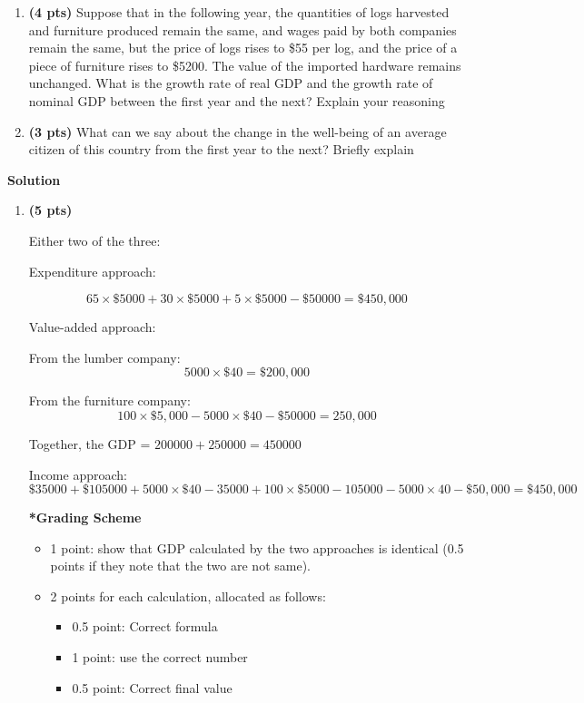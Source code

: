 \documentclass[14pt, oneside]{memoir}
\begin{document}
{{{\begin{enumerate}[label=\textbf{\arabic*.}, itemsep=15pt]
\begin{enumerate}[label=(\alph*)]
	
	\item \textbf{(4 pts)} Suppose that in the following year, the quantities of logs harvested and furniture produced remain the same, and wages paid by both companies remain the same, but the price of logs rises to \$55 per log, and the price of a piece of furniture rises to \$5200. The value of the imported hardware remains unchanged. What is the growth rate of real GDP and the growth rate of nominal GDP between the first year and the next? Explain your reasoning
	
	\item \textbf{(3 pts)} What can we say about the change in the well-being of an average citizen of this country from the first year to the next? Briefly explain
	
\end{enumerate}

\clearpage
\textbf{Solution}
\begin{enumerate}[label=(\alph*)]
	\item \textbf{(5 pts)} 	
	
	Either two of the three:
	
	Expenditure approach:
	
	\[65 \times \$5000 + 30 \times \$5000 + 5 \times \$5000 -\$50000= \$450,000\]
	
	Value-added approach:
	
	From the lumber company:
	\[5000 \times \$40 = \$200,000\]
	
	From the furniture company:
	\[100 \times \$5,000 - 5000 \times \$40  - \$50000= 250,000\]
	
	Together, the GDP = $200000+250000 = 450000$
	
	Income approach:
	\[\$35000 + \$105000 + 5000\times \$40 -35000 + 100 \times \$5000 - 105000 - 5000\times 40 - \$50,000 = \$450,000\]
	
	
	\textbf{*Grading Scheme}
	
	\begin{itemize}
		\item 1 point: show that GDP calculated by the two approaches is identical (0.5 points if they note that the two are not same).
		\item 2 points for each calculation, allocated as follows:
		\begin{itemize}
			\item 0.5 point: Correct formula  
			\item 1 point: use the correct number
			\item 0.5 point: Correct final value  
		\end{itemize}
	\end{itemize}
	

\end{enumerate}
\end{enumerate}}}}
\end{document}
